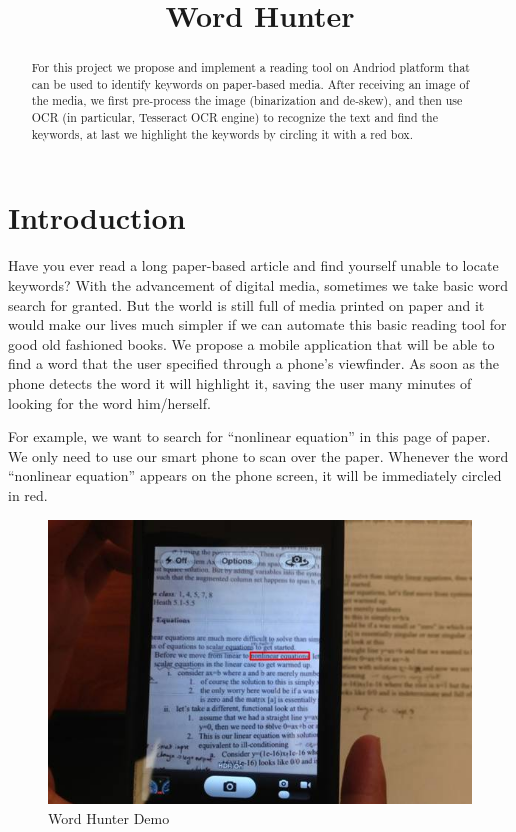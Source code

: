 \documentclass[conference]{IEEEtran}
\begin{document}
\title{Word Hunter}
\author{
\and
{}
\and
{}
}

\maketitle


\begin{abstract}
For this project we propose and implement a reading tool on Andriod platform that can be used to identify keywords on paper-based media.  After receiving an image of the media, we first pre-process the image (binarization and de-skew), and then use OCR (in particular, Tesseract OCR engine) to recognize the text and find the keywords, at last we highlight the keywords by circling it with a red box.
\end{abstract}

\section{Introduction}
Have you ever read a long paper-based article and find yourself unable to locate keywords? With the advancement of digital media, sometimes we take basic word search for granted. But the world is still full of media printed on paper and it would make our lives much simpler if we can automate this basic reading tool for good old fashioned books. We propose a mobile application that will be able to find a word that the user specified through a phone’s viewfinder. As soon as the phone detects the word it will highlight it, saving the user many minutes of looking for the word him/herself. 

For example, we want to search for “nonlinear equation” in this page of paper. We only need to use our smart phone to scan over the paper. Whenever the word “nonlinear equation” appears on the phone screen, it will be immediately circled in red.\\

\begin{figure}
\center
\includegraphics[scale=0.5]{demo.jpg}
\caption{Word Hunter Demo}
\end{figure}
\end{document}
